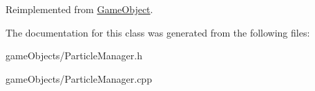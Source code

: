 Reimplemented from \hyperlink{class_game_object_acf6423054877d1344b6e0b1f4e740df5}{Game\+Object}.



The documentation for this class was generated from the following files\+:\begin{DoxyCompactItemize}
\item 
game\+Objects/Particle\+Manager.\+h\item 
game\+Objects/Particle\+Manager.\+cpp\end{DoxyCompactItemize}
